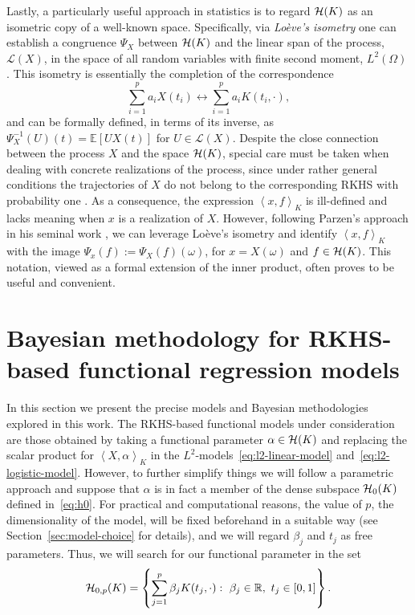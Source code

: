 \documentclass[ba]{imsart}
\numberwithin{equation}{section}
\theoremstyle{plain}
\newcommand{\R}{\mathbb{R}}
\newcommand{\E}{\mathbb{E}}
\newcommand{\Hcal}{\ensuremath\mathcal{H}}
\newcommand\dotprod[2]{\left\langle #1, #2 \right\rangle}
\begin{document}
Lastly, a particularly useful approach in statistics is to regard \(\Hcal(K)\) as an isometric copy of a well-known space. Specifically, via \textit{Loève's isometry} \citep{loeve1948fonctions} one can establish a congruence \(\Psi_X\) between \(\Hcal(K)\) and the linear span of the process, \(\mathcal L(X)\), in the space of all random variables with finite second moment, \(L^2(\Omega)\) \citep[see Lemma 1.1 in][]{lukic2001stochastic}. This isometry is essentially the completion of the correspondence
  \begin{equation}\label{eq:loeves-isometry}
  \sum_{i=1}^p a_i X(t_i) \longleftrightarrow \sum_{i=1}^p a_i K(t_i, \cdot),
  \end{equation}
and can be formally defined, in terms of its inverse, as \(\Psi^{-1}_X(U)(t) = \E[U X(t)]\) for \(U \in \mathcal L(X)\).
Despite the close connection between the process \(X\) and the space \(\Hcal(K)\), special care must be taken when dealing with concrete realizations of the process, since under rather general conditions the trajectories of \(X\) do not belong to the corresponding RKHS with probability one \citep[see for example][Cor.~7.1]{lukic2001stochastic}. As a consequence, the expression \(\dotprod{x}{f}_K\) is ill-defined and lacks meaning when \(x\) is a realization of \(X\). However, following Parzen's approach in his seminal work \citep[e.g.][Th.~4E]{parzen1961approach}, we can leverage Loève's isometry and identify \(\dotprod{x}{f}_K \) with the image \( \Psi_x(f) := \Psi_X(f)(\omega)\), for \(x=X(\omega)\) and \(f\in \Hcal(K)\). This notation, viewed as a formal extension of the inner product, often proves to be useful and convenient.

\section{Bayesian methodology for RKHS-based functional regression models}\label{sec:methodology}

In this section we present the precise models and Bayesian methodologies explored in this work. The RKHS-based functional models under consideration \citep[see][]{berrendero2018functional, berrendero2019rkhs} are those obtained by taking a functional parameter \(\alpha \in \Hcal(K)\) and replacing the scalar product for \(\dotprod{X}{\alpha}_K\) in the \(L^2\)-models~\eqref{eq:l2-linear-model} and~\eqref{eq:l2-logistic-model}. However, to further simplify things we will follow a parametric approach and suppose that \(\alpha\) is in fact a member of the dense subspace \(\Hcal_0(K)\) defined in~\eqref{eq:h0}. For practical and computational reasons, the value of \(p\), the dimensionality of the model, will be fixed beforehand in a suitable way (see Section~\ref{sec:model-choice} for details), and we will regard \(\beta_j\) and \(t_j\) as free parameters. Thus, we will search for our functional parameter in the set
\begin{equation}\label{eq:h0p}
\Hcal_{0,p}(K)=\left\{ \sum_{j=1}^p \beta_j K(t_j, \cdot): \ \beta_j \in \R, \ t_j \in [0, 1]\right\}.
\end{equation}
\end{document}
